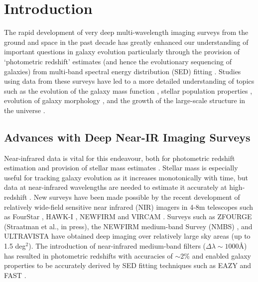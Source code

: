 \documentclass[iop]{emulateapj}
\newcommand{\around}{$\sim$}
\begin{document}
\section{Introduction}


The rapid development of very deep multi-wavelength imaging surveys from the ground and space in the past decade has greatly enhanced our understanding of  important questions in galaxy evolution particularly through the provision of `photometric redshift' estimates (and hence the evolutionary sequencing of galaxies)  from multi-band spectral energy distribution (SED)
fitting \citep{Whitaker2011,McCracken2012,Skelton2014}. Studies using data from these surveys have led to a more detailed understanding of topics such as the evolution of the galaxy mass function \cite[eg.,][]{Marchesini2010,Muzzin2013,Tomczak2014,Grazian2015}, stellar population properties \cite[eg.,][]{Maseda2014,Spitler2014,Pacifici2015}, evolution of galaxy morphology \cite[eg.,][]{Huertas-Company2015,Papovich2015}, and the growth of the large-scale structure in the universe \citep{Adelberger2005,Wake2011}. 


\subsection{Advances with Deep Near-IR Imaging Surveys}

Near-infrared data is vital for this endeavour, both for photometric redshift estimation \citep{Dahlen2013,Rafelski2015} and provision of stellar mass estimates \citep{Brinchmann2000,Muzzin2009}. 
Stellar mass is especially useful for tracking galaxy evolution as it increases monotonically with time, but data at near-infrared wavelengths
are needed to estimate it accurately at high-redshift \citep[][Straatman et al. in press]{Whitaker2011}. New surveys have been made possible by the recent development of relatively wide-field sensitive near infrared (NIR) imagers in 4-8m telescopes such as FourStar \citep{Persson2013} , HAWK-I \citep{Pirard2004}, NEWFIRM \citep{NEWFIRM} and VIRCAM \citep{Dalton2006}. Surveys such as ZFOURGE (Straatman et al., in press), the NEWFIRM medium-band Survey (NMBS) \citep{Whitaker2011}, and ULTRAVISTA \citep{McCracken2012} have obtained deep imaging over relatively large  sky areas (up to 1.5 deg$^2$). The introduction of near-infrared medium-band filters ($\Delta\lambda\sim 1000$\AA) has resulted in photometric redshifts with accuracies of \around2\% \citep{Whitaker2011} and enabled galaxy properties to be accurately derived by SED fitting techniques such as EAZY \citep{Brammer2008} and FAST \citep{Kriek2009}. 
\end{document}
